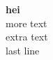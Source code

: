 \documentclass{article}
\begin{document}
    \textbf{hei}\\
    more text\\
    extra text\\
    last line
\end{document}
